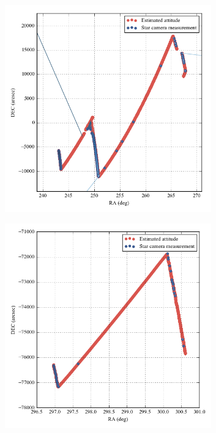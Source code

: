 \begin{landscape}
\begin{figure}[!h]
\begin{subfigure}[b]{0.7\textwidth}
		\centering
		\includegraphics[width=0.98\textwidth]{Figures/Slew_with_starcam_1.png} 
		\caption{}
		\label{subfig:SlewWithStarcam1}
\end{subfigure}
\begin{subfigure}[b]{0.7\textwidth}
		\centering
		\includegraphics[width=0.98\textwidth]{Figures/Slew_with_starcam_2.png} 

\end{subfigure}
\end{figure}
\end{landscape}

